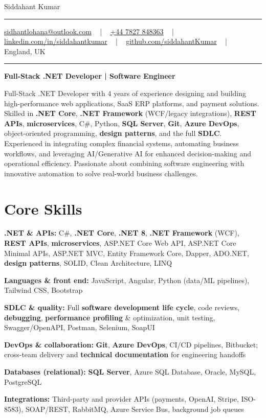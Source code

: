 \documentclass[letterpaper,10pt]{article}
\newcommand{\documentTitle}[2]{
  \begin{center}
    \vspace*{-0.3in}
    {\Huge\color{accentTitle} #1}
    \vspace{8pt}
    {\color{accentLine} \hrule}
    \vspace{2pt}
    \footnotesize{#2}
    \vspace{2pt}
    {\color{accentLine} \hrule}
  \end{center}
}
\newenvironment{resume_list}{
  \vspace{-7pt}
  \begin{itemize}[itemsep=-2px, parsep=1pt, leftmargin=30pt]
}{
  \end{itemize}
}
\begin{document}
\documentTitle{Siddahant Kumar}{
\vspace{0.1cm}
\href{mailto:sidhantlohana@outlook.com}{sidhantlohana@outlook.com} ~ | ~
\href{tel:+447827848363}{+44 7827 848363} ~ | ~
\href{https://www.linkedin.com/in/siddahantkumar/}{linkedin.com/in/siddahantkumar} ~ | ~
\href{https://github.com/siddahantKumar}{github.com/siddahantKumar} ~ | ~
England, UK
}

\begin{center}
\textbf{Full-Stack .NET Developer | Software Engineer}
\end{center}

Full-Stack .NET Developer with 4 years of experience designing and building high-performance web applications, SaaS ERP platforms, and payment solutions. Skilled in \textbf{.NET Core}, \textbf{.NET Framework} (WCF/legacy integrations), \textbf{REST APIs}, \textbf{microservices}, C\#, Python, \textbf{SQL Server}, \textbf{Git}, \textbf{Azure DevOps}, object-oriented programming, \textbf{design patterns}, and the full \textbf{SDLC}. Experienced in integrating complex financial systems, automating business workflows, and leveraging AI/Generative AI for enhanced decision-making and operational efficiency. Passionate about combining software engineering with innovative automation to solve real-world business challenges.


\section{Core Skills}

\begin{resume_list}
    \item \textbf{.NET \& APIs:} C\#, \textbf{.NET Core}, \textbf{.NET 8}, \textbf{.NET Framework} (WCF), \textbf{REST APIs}, \textbf{microservices}, ASP.NET Core Web API, ASP.NET Core Minimal APIs, ASP.NET MVC, Entity Framework Core, Dapper, ADO.NET, \textbf{design patterns}, SOLID, Clean Architecture, LINQ
    \item \textbf{Languages \& front end:} JavaScript, Angular, Python (data/ML pipelines), Tailwind CSS, Bootstrap
    \item \textbf{SDLC \& quality:} Full \textbf{software development life cycle}, code reviews, \textbf{debugging}, \textbf{performance profiling} \& optimization, unit testing, Swagger/OpenAPI, Postman, Selenium, SoapUI
    \item \textbf{DevOps \& collaboration:} \textbf{Git}, \textbf{Azure DevOps}, CI/CD pipelines, Bitbucket; cross-team delivery and \textbf{technical documentation} for engineering handoffs
    \item \textbf{Databases (relational):} \textbf{SQL Server}, Azure SQL Database, Oracle, MySQL, PostgreSQL
    \item \textbf{Integrations:} Third-party and provider APIs (payments, OpenAI, Stripe, ISO-8583), SOAP/REST, RabbitMQ, Azure Service Bus, background job queues
\end{resume_list}
\end{document}
